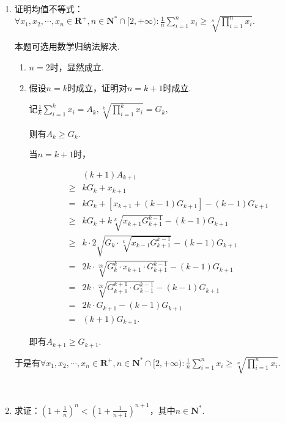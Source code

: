 \documentclass[8pt]{article}
\begin{document}
	\begin{enumerate}
		\item 证明均值不等式：$\displaystyle \forall x_1, x_2, \cdots, x_n \in \mathbf{R}^{+}, n \in \mathbf{N}^{*}\cap[2, +\infty): \frac{1}{n}\sum_{i=1}^{n}{x_i}\geq\sqrt[n]{\prod_{i=1}^{n}{x_i}}.$

			本题可选用数学归纳法解决.

			\begin{enumerate}[label=$\arabic*^{\circ}$]
				\item $n=2$时，显然成立.

				\item 假设$n=k$时成立，证明对$n=k+1$时成立.

					记$\displaystyle\frac{1}{k}\sum_{i=1}^{k}{x_i}=A_k, \sqrt[k]{\prod_{i=1}^{k}{x_i}}=G_k,$

					则有$A_k\geq G_k.$

					当$n=k+1$时，

					$$
					\begin{array}{rl}
						     & (k+1)A_{k+1}\\
						\geq & kG_{k}+x_{k+1}\\
						   = & kG_{k}+[x_{k+1}+(k-1)G_{k+1}]-(k-1)G_{k+1}\\
						\geq & kG_{k}+k\sqrt[k]{x_{k+1}G_{k+1}^{k-1}}-(k-1)G_{k+1}\\
						\geq & k\cdot2\sqrt{G_{k}\cdot\sqrt[k]{x_{k-1}G_{k+1}^{k-1}}}-(k-1)G_{k+1}\\
						   = & 2k\cdot\sqrt[2k]{G_{k}^{k}\cdot x_{k+1}\cdot G_{k+1}^{k-1}}-(k-1)G_{k+1}\\
						   = & 2k\cdot\sqrt[2k]{G_{k+1}^{k+1}\cdot G_{k-1}^{k-1}}-(k-1)G_{k+1}\\
						   = & 2k\cdot G_{k+1}-(k-1)G_{k+1}\\
						   = & (k+1)G_{k+1}.
					\end{array}
					$$

					即有$A_{k+1}\geq G_{k+1}.$

			\end{enumerate}

			于是有$\displaystyle \forall x_1, x_2, \cdots, x_n \in \mathbf{R}^{+}, n \in \mathbf{N}^{*}\cap[2, +\infty): \frac{1}{n}\sum_{i=1}^{n}{x_i}\geq\sqrt[n]{\prod_{i=1}^{n}{x_i}}.$

		~\\

		\item 求证：$\displaystyle\left(1+\frac{1}{n}\right)^n<\left(1+\frac{1}{n+1}\right)^{n+1}$，其中$n\in\mathbf{N}^{*}.$


\end{enumerate}
\end{document}
